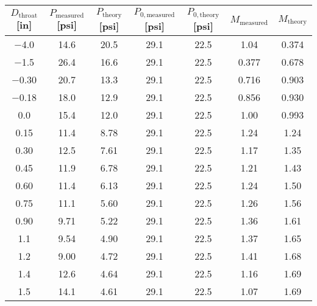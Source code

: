 \begin{tabular}{ccccccc}
\toprule
$D_\text{throat}$ [\unit{in}] & $P_\text{measured}$ [\unit{psi}] & $P_\text{theory}$ [\unit{psi}] & $P_{0,\text{measured}}$ [\unit{psi}] & $P_{0,\text{theory}}$ [\unit{psi}] & $M_\text{measured}$ & $M_\text{theory}$ \\
\midrule
\num{-4.0} & \num{14.6} & \num{20.5} & \num{29.1} & \num{22.5} & \num{1.04} & \num{0.374} \\ 
\num{-1.5} & \num{26.4} & \num{16.6} & \num{29.1} & \num{22.5} & \num{0.377} & \num{0.678} \\ 
\num{-0.30} & \num{20.7} & \num{13.3} & \num{29.1} & \num{22.5} & \num{0.716} & \num{0.903} \\ 
\num{-0.18} & \num{18.0} & \num{12.9} & \num{29.1} & \num{22.5} & \num{0.856} & \num{0.930} \\ 
\num{0.0} & \num{15.4} & \num{12.0} & \num{29.1} & \num{22.5} & \num{1.00} & \num{0.993} \\ 
\num{0.15} & \num{11.4} & \num{8.78} & \num{29.1} & \num{22.5} & \num{1.24} & \num{1.24} \\ 
\num{0.30} & \num{12.5} & \num{7.61} & \num{29.1} & \num{22.5} & \num{1.17} & \num{1.35} \\ 
\num{0.45} & \num{11.9} & \num{6.78} & \num{29.1} & \num{22.5} & \num{1.21} & \num{1.43} \\ 
\num{0.60} & \num{11.4} & \num{6.13} & \num{29.1} & \num{22.5} & \num{1.24} & \num{1.50} \\ 
\num{0.75} & \num{11.1} & \num{5.60} & \num{29.1} & \num{22.5} & \num{1.26} & \num{1.56} \\ 
\num{0.90} & \num{9.71} & \num{5.22} & \num{29.1} & \num{22.5} & \num{1.36} & \num{1.61} \\ 
\num{1.1} & \num{9.54} & \num{4.90} & \num{29.1} & \num{22.5} & \num{1.37} & \num{1.65} \\ 
\num{1.2} & \num{9.00} & \num{4.72} & \num{29.1} & \num{22.5} & \num{1.41} & \num{1.68} \\ 
\num{1.4} & \num{12.6} & \num{4.64} & \num{29.1} & \num{22.5} & \num{1.16} & \num{1.69} \\ 
\num{1.5} & \num{14.1} & \num{4.61} & \num{29.1} & \num{22.5} & \num{1.07} & \num{1.69} \\ 
\bottomrule
\end{tabular}